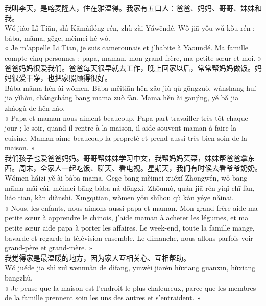 \documentclass[11pt]{article}
\begin{document}
\begin{textebox}
我叫李天，是喀麦隆人，住在雅温得。我家有五口人：爸爸、妈妈、哥哥、妹妹和我。\\
Wǒ jiào Lǐ Tiān, shì Kāmàilóng rén, zhù zài Yǎwēndé. Wǒ jiā yǒu wǔ kǒu rén : bàba, māma, gēge, mèimei hé wǒ.\\
« Je m'appelle Li Tian, je suis camerounais et j'habite à Yaoundé. Ma famille compte cinq personnes : papa, maman, mon grand frère, ma petite sœur et moi. »\\[4pt]
爸爸妈妈很爱我们。爸爸每天很早就去工作，晚上回家以后，常常帮妈妈做饭。妈妈很爱干净，也把家照顾得很好。\\
Bàba māma hěn ài wǒmen. Bàba měitiān hěn zǎo jiù qù gōngzuò, wǎnshang huí jiā yǐhòu, chángcháng bāng māma zuò fàn. Māma hěn ài gānjìng, yě bǎ jiā zhàogù de hěn hǎo.\\
« Papa et maman nous aiment beaucoup. Papa part travailler très tôt chaque jour ; le soir, quand il rentre à la maison, il aide souvent maman à faire la cuisine. Maman aime beaucoup la propreté et prend aussi très bien soin de la maison. »\\[4pt]
我们孩子也爱爸爸妈妈。哥哥帮妹妹学习中文，我帮妈妈买菜，妹妹帮爸爸拿东西。周末，全家人一起吃饭、聊天、看电视。星期天，我们有时候去看爷爷奶奶。\\
Wǒmen háizi yě ài bàba māma. Gēge bāng mèimei xuéxí Zhōngwén, wǒ bāng māma mǎi cài, mèimei bāng bàba ná dōngxi. Zhōumò, quán jiā rén yìqǐ chī fàn, liáo tiān, kàn diànshì. Xīngqītiān, wǒmen yǒu shíhou qù kàn yéye nǎinai.\\
« Nous, les enfants, nous aimons aussi papa et maman. Mon grand frère aide ma petite sœur à apprendre le chinois, j'aide maman à acheter les légumes, et ma petite sœur aide papa à porter les affaires. Le week-end, toute la famille mange, bavarde et regarde la télévision ensemble. Le dimanche, nous allons parfois voir grand-père et grand-mère. »\\[4pt]
我觉得家是最温暖的地方，因为家人互相关心、互相帮助。\\
Wǒ juéde jiā shì zuì wēnnuǎn de dìfang, yīnwèi jiārén hùxiāng guānxīn, hùxiāng bāngzhù.\\
« Je pense que la maison est l'endroit le plus chaleureux, parce que les membres de la famille prennent soin les uns des autres et s'entraident. »
\end{textebox}
\end{document}
